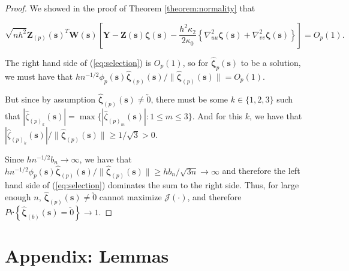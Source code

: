 \documentclass[authoryear,review, 12pt]{elsarticle}
\begin{document}
\begin{proof}
We showed in the proof of Theorem \ref{theorem:normality} that

\[
\sqrt{nh^{2}}\bm{Z}_{\left(p\right)}\left(\bm{s}\right)^{T}\bm{W}\left(\bm{s}\right)\left[\bm{Y}-\bm{Z}\left(\bm{s}\right)\bm{\zeta}\left(\bm{s}\right)-\frac{h^{2}\kappa_{2}}{2\kappa_{0}}\left\{ \nabla_{uu}^{2}\bm{\zeta}\left(\bm{s}\right)+\nabla_{vv}^{2}\bm{\zeta}\left(\bm{s}\right)\right\} \right]=O_{p}\left(1\right).
\]


The right hand side of (\ref{eq:selection}) is $O_{p}(1)$, so for
$\hat{\bm{\zeta}}_{p}\left(\bm{s}\right)$ to be a solution, we must
have that $hn^{-1/2}\phi_{p}\left(\bm{s}\right)\hat{\bm{\zeta}}_{\left(p\right)}\left(\bm{s}\right)/\|\hat{\bm{\zeta}}_{\left(p\right)}\left(\bm{s}\right)\|=O_{p}\left(1\right)$.

But since by assumption $\hat{\bm{\zeta}}_{\left(p\right)}\left(\bm{s}\right)\ne\utilde{0}$,
there must be some $k\in\{1,2,3\}$ such that $|\hat{\zeta}_{\left(p\right)_{k}}\left(\bm{s}\right)|=\max\{|\hat{\zeta}_{\left(p\right)_{m}}\left(\bm{s}\right)|:1\le m\le3\}$.
And for this $k$, we have that $|\hat{\zeta}_{\left(p\right)_{k}}\left(\bm{s}\right)|/\|\hat{\bm{\zeta}}_{\left(p\right)}\left(\bm{s}\right)\|\ge1/\sqrt{3}>0$.

Since $hn^{-1/2}b_{n}\to\infty$, we have that $hn^{-1/2}\phi_{p}\left(\bm{s}\right)\hat{\bm{\zeta}}_{\left(p\right)}\left(\bm{s}\right)/\|\hat{\bm{\zeta}}_{\left(p\right)}\left(\bm{s}\right)\|\ge hb_{n}/\sqrt{3n}\to\infty$
and therefore the left hand side of (\ref{eq:selection}) dominates
the sum to the right side. Thus, for large enough $n$, $\hat{\bm{\zeta}}_{\left(p\right)}\left(\bm{s}\right)\ne\utilde{0}$
cannot maximize $\mathcal{J}\left(\cdot\right)$, and therefore $Pr\left\{ \hat{\bm{\zeta}}_{(b)}\left(\bm{s}\right)=\utilde{0}\right\} \to1$. 
\end{proof}

\section*{Appendix: Lemmas}
\end{document}

